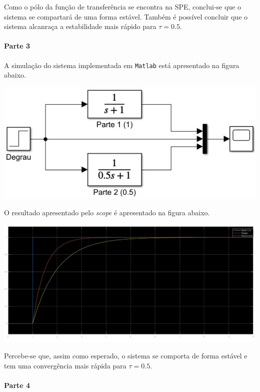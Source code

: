 \documentclass[
]{book}
\theoremstyle{definition}
\theoremstyle{definition}
\theoremstyle{definition}
\theoremstyle{remark}
\begin{document}
Como o pólo da função de transferência se encontra na SPE, conclui-se que o sistema se compartará de uma forma estável. Também é possível concluir que o sistema alcanraça a estabilidade mais rápido para \(\tau = 0.5\).

\hypertarget{parte-3}{%
\paragraph*{Parte 3}\label{parte-3}}

A simulação do sistema implementada em \texttt{Matlab} está apresentado na figura abaixo.

\includegraphics{Imagens/Lab2/sim1.jpg}

O resultado apresentado pelo \emph{scope} é apresentado na figura abaixo.

\includegraphics{Imagens/Lab2/resultSim1.jpg}

Percebe-se que, assim como esperado, o sistema se comporta de forma estável e tem uma convergência mais rápida para \(\tau = 0.5\).

\hypertarget{parte-4}{%
\paragraph*{Parte 4}\label{parte-4}}
\end{document}
